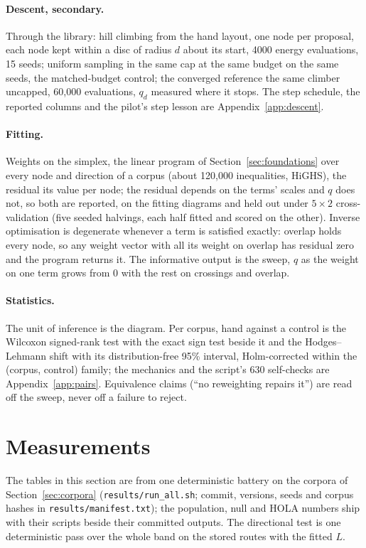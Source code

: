 \documentclass[a4paper,UKenglish]{gd-lipics-v3}
\begin{document}
\paragraph{Descent, secondary.} Through the library: hill climbing from the hand
layout, one node per proposal, each node kept within a disc of radius $d$ about its
start, 4000 energy evaluations, 15 seeds; uniform sampling in the same cap at the same
budget on the same seeds, the matched-budget control; the converged reference the same
climber uncapped, 60{,}000 evaluations, $q_d$ measured where it stops. The step
schedule, the reported columns and the pilot's step lesson are
Appendix~\ref{app:descent}.

\paragraph{Fitting.} Weights on the simplex, the linear program of Section~\ref{sec:foundations} over every node and direction of a corpus (about 120{,}000 inequalities, HiGHS), the residual its value per node; the residual depends on the terms' scales and $q$ does not, so both are reported, on the fitting diagrams and held out under $5 \times 2$ cross-validation (five seeded halvings, each half fitted and scored on the other). Inverse optimisation is degenerate whenever a term is satisfied exactly: overlap holds every node, so any weight vector with all its weight on overlap has residual zero and the program returns it. The informative output is the sweep, $q$ as the weight on one term grows from 0 with the rest on crossings and overlap.

\paragraph{Statistics.} The unit of inference is the diagram. Per corpus, hand against
a control is the Wilcoxon signed-rank test with the exact sign test beside it and the
Hodges--Lehmann shift with its distribution-free 95\% interval, Holm-corrected within
the (corpus, control) family; the mechanics and the script's 630 self-checks are
Appendix~\ref{app:pairs}. Equivalence claims (``no reweighting repairs it'') are read
off the sweep, never off a failure to reject.

\section{Measurements}\label{sec:results}


The tables in this section are from one deterministic battery on the corpora of
Section~\ref{sec:corpora} (\texttt{results/run\_all.sh}; commit, versions, seeds and
corpus hashes in \texttt{results/manifest.txt}); the population,
null and HOLA numbers ship with their scripts beside their committed outputs. The
directional test is one deterministic pass over the
whole band on the stored routes with the fitted $L$.
\end{document}
